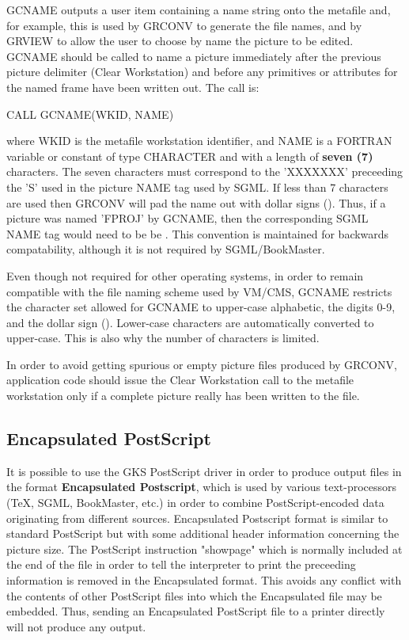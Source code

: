 GCNAME outputs a user item containing a name string onto the metafile
and, for example, this is used by GRCONV to generate the file names,
and by GRVIEW to allow the user to choose by name the picture to be edited.
GCNAME should be called to name a picture immediately after the previous
picture delimiter (Clear Workstation) and before any primitives or attributes
for the named frame have been written out. The call is:
\begin{XMP}
CALL GCNAME(WKID, NAME)
\end{XMP}
where WKID is the metafile workstation identifier,
and NAME is a FORTRAN variable or constant of type CHARACTER
and with a length of {\bf seven (7)} characters.
The seven characters must correspond to the 'XXXXXXX' preceeding the 'S'
used in the picture NAME tag used by SGML.
If less than 7 characters are used then GRCONV
will pad the name out with dollar signs ().
Thus, if a picture was named 'FPROJ' by GCNAME, then the corresponding SGML
NAME tag would need to be be .
This convention is maintained for backwards compatability, although
it is not required by SGML/BookMaster.
 
Even though not required for other operating systems, in order
to remain compatible with the file naming scheme used by VM/CMS,
GCNAME restricts the character set allowed for GCNAME to upper-case alphabetic,
the digits 0-9, and the dollar sign ().
Lower-case characters are automatically converted to upper-case.
This is also why the number of characters is limited.
 
In order to avoid getting spurious or empty picture files produced by
GRCONV, application code should issue the Clear Workstation call to
the metafile workstation only if a complete picture really has been written to
the file.
\subsection{\protect\label{sec:epsref}Encapsulated PostScript}
 
It is possible to use the GKS PostScript driver in order to produce output
files in the format {\bf Encapsulated Postscript}, which is used by
various text-processors (TeX, SGML, BookMaster, etc.) in order to combine
PostScript-encoded data originating from different sources.
Encapsulated Postscript format is similar to standard PostScript but
with some additional header information concerning the picture size.
The PostScript instruction "showpage" which is normally included
at the end of the file in order to tell the interpreter to print the
preceeding information is removed in the Encapsulated format.
This avoids any conflict with the contents of other PostScript files
into which the Encapsulated file may be embedded.
Thus, sending an Encapsulated PostScript file to a printer directly will
not produce any output.
 
